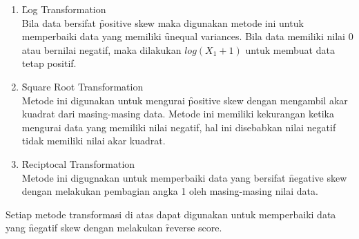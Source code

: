 \begin{enumerate}
	\item \f{Log Transformation}\\
	Bila data bersifat \f{positive skew} maka digunakan metode ini untuk memperbaiki data yang memiliki \f{unequal variances}. Bila data memiliki nilai 0 atau bernilai negatif, maka dilakukan $log(X_{1}+1)$ untuk membuat data tetap positif.
	\item \f{Square Root Transformation}\\
	Metode ini digunakan untuk mengurai \f{positive skew} dengan mengambil akar kuadrat dari masing-masing data. Metode ini memiliki kekurangan ketika mengurai data yang memiliki nilai negatif, hal ini disebabkan nilai negatif tidak memiliki nilai akar kuadrat.
	\item \f{Reciptocal Transformation}\\
	Metode ini digugnakan untuk memperbaiki data yang bersifat \f{negative skew} dengan melakukan pembagian angka 1 oleh masing-masing nilai data.
\end{enumerate}
Setiap metode transformasi di atas dapat digunakan untuk memperbaiki data yang \f{negatif skew} dengan melakukan \f{reverse score}.
